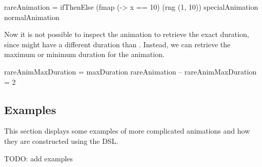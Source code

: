 \begin{spec}
rareAnimation =
  ifThenElse
    (fmap (\x -> x == 10) (rng (1, 10))
    specialAnimation
    normalAnimation
\end{spec}

Now it is not possible to inspect the animation to retrieve the exact duration, since  might have a different duration than . Instead, we can retrieve the maximum or minimum duration for the animation.

\begin{spec}
rareAnimMaxDuration = maxDuration rareAnimation
-- rareAnimMaxDuration = 2
\end{spec}

\subsection{Examples}

This section displays some examples of more complicated animations and how they are constructed using the DSL.

TODO: add examples
